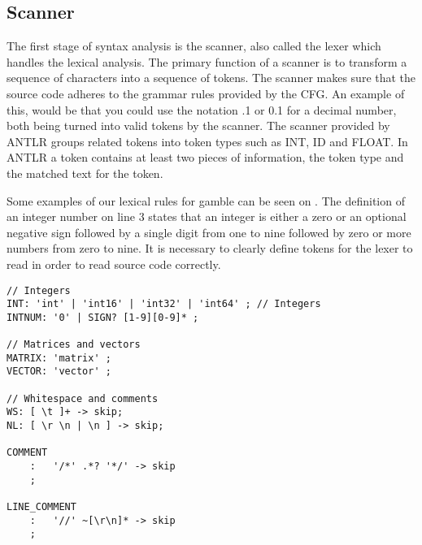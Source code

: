 \subsection{Scanner}
The first stage of syntax analysis is the scanner, also called the lexer which handles the lexical analysis.
The primary function of a scanner is to transform a sequence of characters into a sequence of tokens.
The scanner makes sure that the source code adheres to the grammar rules provided by the CFG.
An example of this, would be that you could use the notation .1 or 0.1 for a decimal number, both being turned into valid tokens by the scanner.
The scanner provided by ANTLR groups related tokens into token types such as INT, ID and FLOAT.
In ANTLR a token contains at least two pieces of information, the token type and the matched text for the token.

Some examples of our lexical rules for \gls{gamble} can be seen on .
The definition of an integer number on line 3 states that an integer is either a zero or an optional negative sign followed by a single digit from one to nine followed by zero or more numbers from zero to nine.
It is necessary to clearly define tokens for the lexer to read in order to read source code correctly. \citep{Crafting_book}

\begin{lstlisting}[caption=Example of our lexer rules for ANTLR4,frame=tlrb,label={lst:token}]
// Integers
INT: 'int' | 'int16' | 'int32' | 'int64' ; // Integers
INTNUM: '0' | SIGN? [1-9][0-9]* ;

// Matrices and vectors
MATRIX: 'matrix' ;
VECTOR: 'vector' ; 

// Whitespace and comments
WS: [ \t ]+ -> skip;
NL: [ \r \n | \n ] -> skip;

COMMENT
    :   '/*' .*? '*/' -> skip
    ;

LINE_COMMENT
    :   '//' ~[\r\n]* -> skip
    ;
\end{lstlisting}